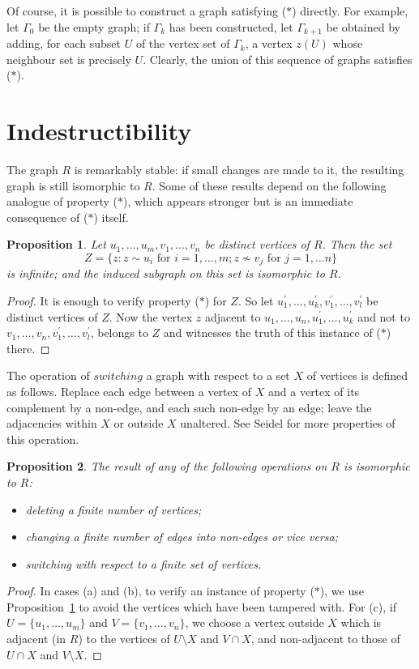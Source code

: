 \documentclass[12pt]{article}
\newtheorem{proposition}{Proposition}
\begin{document}
Of course, it is possible to construct a graph satisfying ($\ast$)
directly. For example, let $\Gamma_0$ be the empty graph; if
$\Gamma_k$ has been constructed, let $\Gamma_{k+1}$ be obtained by
adding, for each subset $U$ of the vertex set of $\Gamma_k$, a
vertex $z(U)$ whose neighbour set is precisely $U$. Clearly, the
union of this sequence of graphs satisfies ($\ast$).

\section{Indestructibility}%
\label{ch32:sec2.3}

The graph $R$ is remarkably stable: if small changes are made to it,
the resulting graph is still isomorphic to $R$. Some of these
results depend on the following analogue of property ($\ast$), which
appears stronger but is an immediate consequence of ($\ast$) itself.
\begin{proposition}\label{ch32:prop3.1} 
Let $u_1, \ldots, u_m, v_1, \ldots, v_n$ be
distinct vertices of $R$. Then the set
\[
Z = \{z : z\sim u_i\mbox{ for }i = 1,\ldots,m; z\nsim v_j\mbox{ for }j = 1,\ldots n\}
\]
is infinite; and the induced subgraph on this set is isomorphic to
$R$.
\end{proposition}
\begin{proof}
It is enough to verify property ($\ast$) for $Z$. So
let $u_1^{\prime}, \ldots, u_k^{\prime}, v_1^{\prime}, \ldots,
v_l^{\prime}$  be distinct vertices of $Z$. Now the vertex $z$
adjacent to $u_1, \ldots, u_n, u_1^{\prime}, \ldots, u_k^{\prime}$
and not to $v_1, \ldots, v_n, v_1^{\prime}, \ldots, v_l^{\prime}$,
belongs to $Z$ and witnesses the truth of this instance of ($\ast$)
there.
\end{proof}

The operation of $switching$ a graph with respect to a set $X$ of
vertices is defined as follows. Replace each edge between a vertex
of $X$ and a vertex of its complement by a non-edge, and each such
non-edge by an edge; leave the adjacencies within $X$ or outside $X$
unaltered. See Seidel \cite{ch32:bib46} for more properties of this
operation.
\begin{proposition}\label{ch32:prop3.2} 
The result of any of the following operations
on $R$ is isomorphic to $R$:
\begin{itemize}
\item[(a)] deleting a finite number of vertices;
\item[(b)] changing a finite number of edges into non-edges or vice versa;
\item[(c)] switching with respect to a finite set of vertices.
\end{itemize}
\end{proposition}
\begin{proof}
In cases (a) and (b), to verify an instance of
property ($\ast$), we use Proposition~\ref{ch32:prop3.1} to avoid
the vertices which have been tampered with. For (c), if $U
=\{u_1,\ldots,u_m\}$ and $V = \{v_1,\ldots, v_n\}$, we choose a
vertex outside $X$ which is adjacent (in $R$) to the vertices of $U
\setminus X$ and $V \cap X$, and non-adjacent to those of $U\cap X$
and $V \setminus X$.
\end{proof}
\end{document}
